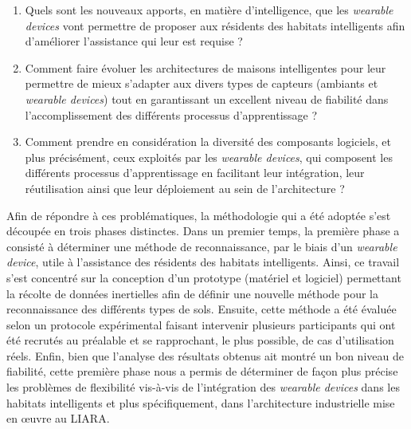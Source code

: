 {{\begin{enumerate}
	\item
		\label{question:1}
		Quels sont les nouveaux apports, en matière d'intelligence, que les \textit{wearable devices} vont permettre de proposer aux résidents des habitats intelligents afin d'améliorer l'assistance qui leur est requise ?
	\item
		\label{question:2}
    Comment faire évoluer les architectures de maisons intelligentes pour leur permettre de mieux s'adapter aux divers types de capteurs (ambiants et \textit{wearable devices}) tout en garantissant un excellent niveau de fiabilité dans l'accomplissement des différents processus d'apprentissage ?
	\item
    \label{question:3}
    Comment prendre en considération la diversité des composants logiciels, et plus précisément, ceux exploités par les \textit{wearable devices}, qui composent les différents processus d'apprentissage en facilitant leur intégration, leur réutilisation ainsi que leur déploiement au sein de l'architecture ?
\end{enumerate}


Afin de répondre à ces problématiques, la méthodologie qui a été adoptée s'est découpée en trois phases distinctes. Dans un premier temps, la première phase a consisté à déterminer une méthode de reconnaissance, par le biais d'un \textit{wearable device}, utile à l'assistance des résidents des habitats intelligents. Ainsi, ce travail s'est concentré sur la conception d'un prototype (matériel et logiciel) permettant la récolte de données inertielles afin de définir une nouvelle méthode pour la reconnaissance des différents types de sols. Ensuite, cette méthode a été évaluée selon un protocole expérimental faisant intervenir plusieurs participants qui ont été recrutés au préalable et se rapprochant, le plus possible, de cas d'utilisation réels. Enfin, bien que l'analyse des résultats obtenus ait montré un bon niveau de fiabilité, cette première phase nous a permis de déterminer de façon plus précise les problèmes de flexibilité vis-à-vis de l'intégration des \textit{wearable devices} dans les habitats intelligents et plus spécifiquement, dans l'architecture industrielle mise en \oe{}uvre au \acs{LIARA}.

}}
